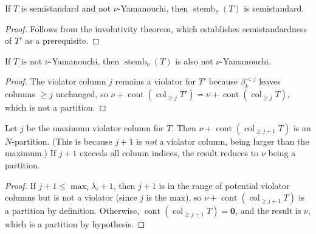 \begin{lemma}
\label{lem.sf.stemb-semistandard}
\leanhelper
\leanok
If $T$ is semistandard and not $\nu$-Yamanouchi, then
$\operatorname{stemb}_\nu(T)$ is semistandard.
\end{lemma}

\begin{proof}
\leanok
Follows from the involutivity theorem, which establishes semistandardness
of $T'$ as a prerequisite.
\end{proof}

\begin{lemma}
\label{lem.sf.stemb-not-yamanouchi}
\leanhelper
\leanok
If $T$ is not $\nu$-Yamanouchi, then
$\operatorname{stemb}_\nu(T)$ is also not $\nu$-Yamanouchi.
\end{lemma}

\begin{proof}
\leanok
The violator column $j$ remains a violator for $T'$ because $\beta_k^{<j}$
leaves columns $\geq j$ unchanged, so
$\nu + \operatorname{cont}(\operatorname{col}_{\geq j} T')
= \nu + \operatorname{cont}(\operatorname{col}_{\geq j} T)$,
which is not a partition.
\end{proof}

\begin{lemma}
\label{lem.sf.stemb-max-violator-preserved}
\leanhelper
\leanok
Let $j$ be the maximum violator column for $T$. Then
$\nu + \operatorname{cont}(\operatorname{col}_{\geq j+1} T)$ is an $N$-partition.
(This is because $j{+}1$ is \emph{not} a violator column, being larger than the maximum.)
If $j{+}1$ exceeds all column indices, the result reduces to $\nu$ being a partition.
\end{lemma}

\begin{proof}
\leanok
If $j{+}1 \leq \max_i \lambda_i + 1$, then $j{+}1$ is in the range of potential
violator columns but is not a violator (since $j$ is the max), so
$\nu + \operatorname{cont}(\operatorname{col}_{\geq j+1} T)$ is a partition
by definition. Otherwise, $\operatorname{cont}(\operatorname{col}_{\geq j+1} T) = \mathbf{0}$,
and the result is $\nu$, which is a partition by hypothesis.
\end{proof}

